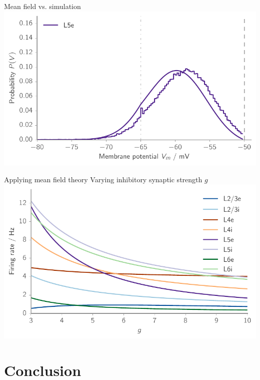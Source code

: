 \documentclass[xcolor=x11names,compress]{beamer}
\renewcommand{\(}{\begin{columns}}
\renewcommand{\)}{\end{columns}}
\newcommand{\<}[1]{\begin{column}{#1}}
\renewcommand{\>}{\end{column}}
\begin{document}
\begin{frame}[t]{Mean field vs. simulation}
    \center
    \includegraphics[height=0.8\textheight]{../figures/membrane_potential_single}
\end{frame}

\begin{frame}[t]{Applying mean field theory}
    Varying inhibitory synaptic strength $g$
    \center
    \includegraphics[height=0.7\textheight]{../figures/simulate_change_g}
\end{frame}

\section{Conclusion}
\label{sec:conclusion}
\end{document}
